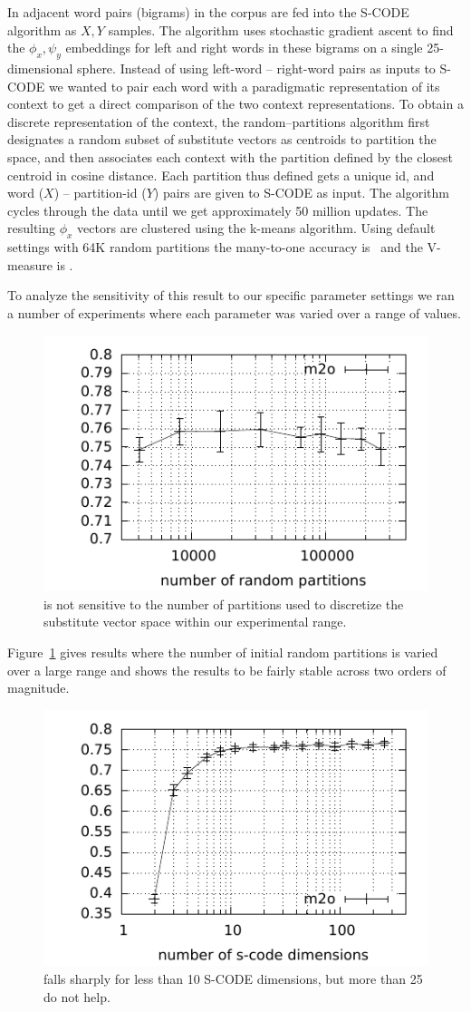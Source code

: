 In \cite{maron2010sphere} adjacent word pairs (bigrams) in the corpus
are fed into the S-CODE algorithm as $X, Y$ samples.  The algorithm
uses stochastic gradient ascent to find the $\phi_x, \psi_y$
embeddings for left and right words in these bigrams on a single
25-dimensional sphere.  Instead of using left-word -- right-word pairs
as inputs to S-CODE we wanted to pair each word with a paradigmatic
representation of its context to get a direct comparison of the two
context representations.  To obtain a discrete representation of the
context, the random--partitions algorithm first designates a random
subset of substitute vectors as centroids to partition the space, and
then associates each context with the partition defined by the closest
centroid in cosine distance.  Each partition thus defined gets a
unique id, and word ($X$) -- partition-id ($Y$) pairs are given to
S-CODE as input.  The algorithm cycles through the data until we get
approximately 50 million updates.  The resulting $\phi_x$ vectors are
clustered using the k-means algorithm.  Using default settings with
64K random partitions the many-to-one accuracy is \rpmto\ and the
V-measure is \rpvm.

To analyze the sensitivity of this result to our specific parameter
settings we ran a number of experiments where each parameter was
varied over a range of values.

\begin{figure}[ht] \centering
\includegraphics[width=0.5\linewidth]{plot-p.pdf}
\caption{\mto is not sensitive to the number of partitions used to
  discretize the substitute vector space within our experimental
  range.}
\label{plot-p}
\end{figure}

Figure~\ref{plot-p} gives results where the number of initial random
partitions is varied over a large range and shows the results to be
fairly stable across two orders of magnitude.

\begin{figure}[ht] \centering
\includegraphics[width=0.5\linewidth]{plot-d.pdf}
\caption{\mto falls sharply for less than 10 S-CODE dimensions, but
  more than 25 do not help.}
\label{plot-d}
\end{figure}

